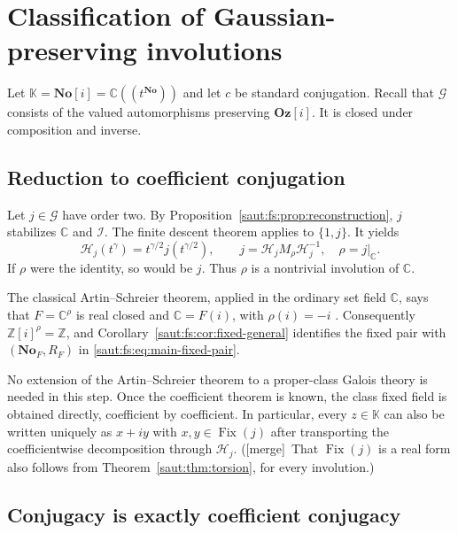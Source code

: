 \documentclass[11pt]{article}
\theoremstyle{definition}
\theoremstyle{remark}
\newcommand{\No}{\mathbf{No}}
\newcommand{\C}{\mathbb C}
\newcommand{\Z}{\mathbb Z}
\newcommand{\K}{\mathbb K}
\newcommand{\Fix}{\operatorname{Fix}}
\newcommand{\Oz}{\mathbf{Oz}}
\newcommand{\Ineg}{\mathcal I}
\newcommand{\mergetag}{\textup{[merge]}}
\numberwithin{equation}{section}
\begin{document}
\section{Classification of Gaussian-preserving involutions}\label{saut:fs:sec:involutions}

Let $\K=\No[i]=\C((t^{\No}))$ and let $c$ be standard conjugation. Recall that
$\mathcal G$ consists of the valued automorphisms preserving $\Oz[i]$. It is closed
under composition and inverse.

\subsection{Reduction to coefficient conjugation}

Let $j\in\mathcal G$ have order two. By
Proposition~\ref{saut:fs:prop:reconstruction}, $j$ stabilizes $\C$ and $\Ineg$. The
finite descent theorem applies to $\{1,j\}$. It yields
\begin{equation}\label{saut:fs:eq:involution-H}
 \mathcal H_j(t^\gamma)=t^{\gamma/2}j(t^{\gamma/2}),\qquad
 j=\mathcal H_jM_\rho\mathcal H_j^{-1},
 \quad \rho=j|_\C.
\end{equation}
If $\rho$ were the identity, so would be $j$. Thus $\rho$ is a nontrivial involution
of $\C$.

The classical Artin--Schreier theorem, applied in the ordinary set field $\C$, says
that $F=\C^\rho$ is real closed and $\C=F(i)$, with $\rho(i)=-i$ \cite{Conrad}.
Consequently $\Z[i]^\rho=\Z$, and Corollary~\ref{saut:fs:cor:fixed-general}
identifies the fixed pair with $(\No_F,R_F)$ in \eqref{saut:fs:eq:main-fixed-pair}.

No extension of the Artin--Schreier theorem to a proper-class Galois theory is
needed in this step. Once the coefficient theorem is known, the class fixed field is
obtained directly, coefficient by coefficient. In particular, every $z\in\K$ can also
be written uniquely as $x+iy$ with $x,y\in\Fix(j)$ after transporting the
coefficientwise decomposition through $\mathcal H_j$. (\mergetag\ That $\Fix(j)$ is a
real form also follows from Theorem~\ref{saut:thm:torsion}, for every involution.)

\subsection{Conjugacy is exactly coefficient conjugacy}
\end{document}
